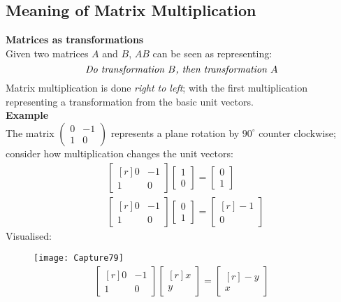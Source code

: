 \documentclass{report}
\begin{document}
\subsection{Meaning of Matrix Multiplication} %
\textbf{Matrices as transformations}\\
Given two matrices $A$ and $B$, $AB$ can be seen as 
representing:
\begin{equation*}
\text{\textit{Do transformation $B$, then transformation $A$}}
\end{equation*}
Matrix multiplication is done \textit{right to left}; with the first multiplication representing
a transformation from the basic unit vectors.\\
\textbf{Example}\\
The matrix $\left(\begin{smallmatrix}0&-1\\1&0\end{smallmatrix}\right)$ represents a 
plane rotation by $90^{\circ}$ counter clockwise;
consider how multiplication changes the unit vectors:
\begin{align*}
&\begin{bmatrix*}[r]
0&-1\\1&0
\end{bmatrix*}
\begin{bmatrix}
1\\0
\end{bmatrix}
=\begin{bmatrix}
0\\1
\end{bmatrix}\\
&\begin{bmatrix*}[r]
0&-1\\1&0
\end{bmatrix*}
\begin{bmatrix}
0\\1
\end{bmatrix}
=\begin{bmatrix*}[r]
-1\\0
\end{bmatrix*}
\end{align*}
Visualised:
\begin{figure}[h]
\texttt{[image: Capture79]}\\
\centering
\begin{align*}
\begin{bmatrix*}[r]
0&-1\\1&0
\end{bmatrix*}
\begin{bmatrix*}[r]
x\\y
\end{bmatrix*}
=\begin{bmatrix*}[r]
-y\\x
\end{bmatrix*}
\end{align*}
\end{figure}\\
\end{document}
